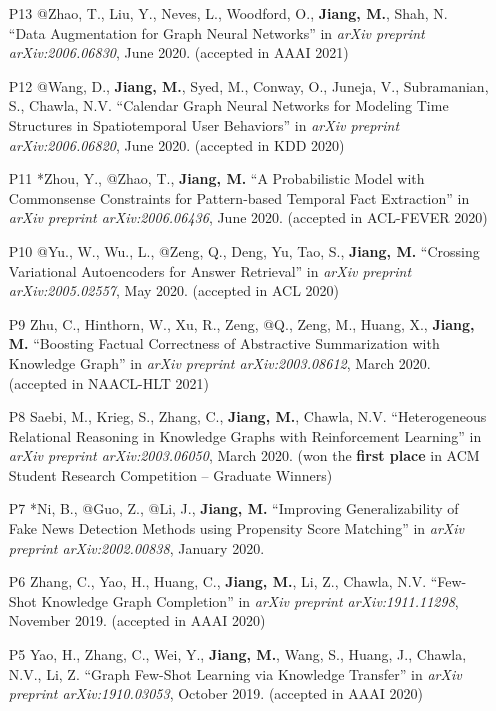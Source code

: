 \documentclass[10pt]{article}
\newenvironment{myindentpar}[1]%
{\begin{list}{}%
         {\setlength{\leftmargin}{#1}}%
         \item[]%
}
{\end{list}}
\newcounter{list}
\begin{document}
\begin{myindentpar}{0.00cm}
{\begin{enumerate}[leftmargin=.5cm]
\item[P13] @Zhao, T., Liu, Y., Neves, L., Woodford, O., \textbf{Jiang, M.}, Shah, N. ``Data Augmentation for Graph Neural Networks'' in \textit{arXiv preprint arXiv:2006.06830}, June 2020. (accepted in AAAI 2021)

\item[P12] @Wang, D., \textbf{Jiang, M.}, Syed, M., Conway, O., Juneja, V., Subramanian, S., Chawla, N.V. ``Calendar Graph Neural Networks for Modeling Time Structures in Spatiotemporal User Behaviors'' in \textit{arXiv preprint arXiv:2006.06820}, June 2020. (accepted in KDD 2020)
		
\item[P11] *Zhou, Y., @Zhao, T., \textbf{Jiang, M.} ``A Probabilistic Model with Commonsense Constraints for Pattern-based Temporal Fact Extraction'' in \textit{arXiv preprint arXiv:2006.06436}, June 2020. (accepted in ACL-FEVER 2020)

\item[P10] @Yu., W., Wu., L., @Zeng, Q., Deng, Yu, Tao, S., \textbf{Jiang, M.} ``Crossing Variational Autoencoders for Answer Retrieval'' in \textit{arXiv preprint arXiv:2005.02557}, May 2020. (accepted in ACL 2020)
		
\item[P9] Zhu, C., Hinthorn, W., Xu, R., Zeng, @Q., Zeng, M., Huang, X., \textbf{Jiang, M.} ``Boosting Factual Correctness of Abstractive Summarization with Knowledge Graph'' in \textit{arXiv preprint arXiv:2003.08612}, March 2020. (accepted in NAACL-HLT 2021)

\item[P8] Saebi, M., Krieg, S., Zhang, C., \textbf{Jiang, M.}, Chawla, N.V. ``Heterogeneous Relational Reasoning in Knowledge Graphs with Reinforcement Learning'' in \textit{arXiv preprint arXiv:2003.06050}, March 2020. (won the \textbf{first place} in ACM Student Research Competition -- Graduate Winners)

\item[P7] *Ni, B., @Guo, Z., @Li, J., \textbf{Jiang, M.} ``Improving Generalizability of Fake News Detection Methods using Propensity Score Matching'' in \textit{arXiv preprint arXiv:2002.00838}, January 2020.
		
\item[P6] Zhang, C., Yao, H., Huang, C., \textbf{Jiang, M.}, Li, Z., Chawla, N.V. ``Few-Shot Knowledge Graph Completion'' in \textit{arXiv preprint arXiv:1911.11298}, November 2019. (accepted in AAAI 2020)

\item[P5] Yao, H., Zhang, C., Wei, Y., \textbf{Jiang, M.}, Wang, S., Huang, J., Chawla, N.V., Li, Z. ``Graph Few-Shot Learning via Knowledge Transfer'' in \textit{arXiv preprint arXiv:1910.03053}, October 2019. (accepted in AAAI 2020)
		

\end{enumerate}}
\end{myindentpar}
\end{document}
